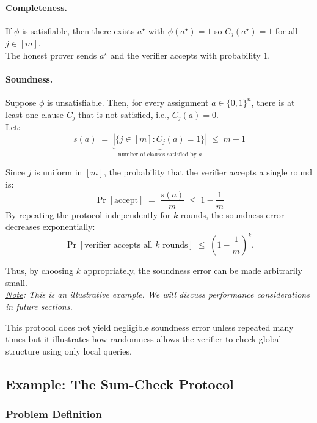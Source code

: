 \paragraph{Completeness.}
If $\phi$ is satisfiable, then there exists $a^\star$ with $\phi(a^\star)=1$ so $C_j(a^\star)=1$ for all $j\in[m]$. \\
\noindent The honest prover sends $a^\star$ and the verifier accepts with probability $1$.

\paragraph{Soundness.}
Suppose $\phi$ is unsatisfiable. Then, for every assignment $a \in \{0,1\}^n$, there is at least one clause $C_j$ that is not satisfied, i.e., $C_j(a) = 0$. \\

\noindent Let:
\[
s(a) \;=\; \underbrace{\left|\{j \in [m] : C_j(a) = 1\}\right|}_{\text{number of clauses satisfied by } a} \;\le\; m-1
\]

\noindent Since $j$ is uniform in $[m]$, the probability that the verifier accepts a single round is:
\[
\Pr[\text{accept}] \;=\; \frac{s(a)}{m} \;\le\; 1-\frac{1}{m}
\]
By repeating the protocol independently for $k$ rounds, the soundness error decreases exponentially:
\[
\Pr[\text{verifier accepts all $k$ rounds}] \;\le\; \left(1-\frac{1}{m}\right)^k.
\]

\noindent Thus, by choosing $k$ appropriately, the soundness error can be made arbitrarily small. \\

\noindent \textit{\underline{Note}: This is an illustrative example. We will discuss performance considerations in future sections.}

\myspace

\begin{remark}
    This protocol does not yield negligible soundness error unless repeated many times but it illustrates how randomness allows the verifier to check global structure using only local queries.
\end{remark}

\subsection*{Example: The Sum-Check Protocol}

\subsubsection*{Problem Definition}

